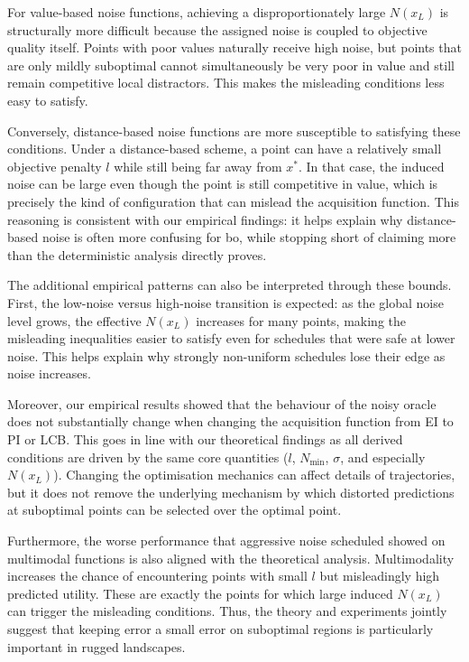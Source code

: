 {For value-based noise functions, achieving a disproportionately large $N(x_L)$ is structurally more difficult because the assigned noise is coupled to objective quality itself. Points with poor values naturally receive high noise, but points that are only mildly suboptimal cannot simultaneously be very poor in value and still remain competitive local distractors. This makes the misleading conditions less easy to satisfy.

Conversely, distance-based noise functions are more susceptible to satisfying these conditions. Under a distance-based scheme, a point can have a relatively small objective penalty $l$ while still being far away from $x^*$. In that case, the induced noise can be large even though the point is still competitive in value, which is precisely the kind of configuration that can mislead the acquisition function. This reasoning is consistent with our empirical findings: it helps explain why distance-based noise is often more confusing for \gls{bo}, while stopping short of claiming more than the deterministic analysis directly proves.

The additional empirical patterns can also be interpreted through these bounds. First, the low-noise versus high-noise transition is expected: as the global noise level grows, the effective $N(x_L)$ increases for many points, making the misleading inequalities easier to satisfy even for schedules that were safe at lower noise. This helps explain why strongly non-uniform schedules lose their edge as noise increases.

Moreover, our empirical results showed that the behaviour of the noisy oracle does not substantially change when changing the acquisition function from EI to PI or LCB. This goes in line with our theoretical findings as all derived conditions are driven by the same core quantities ($l$, $N_{\min}$, $\sigma$, and especially $N(x_L)$). Changing the optimisation mechanics can affect details of trajectories, but it does not remove the underlying mechanism by which distorted predictions at  suboptimal points can be selected over the optimal point.

Furthermore, the worse performance that aggressive noise scheduled showed on multimodal functions is also aligned with the theoretical analysis. Multimodality increases the chance of encountering points with small $l$ but misleadingly high predicted utility. These are exactly the points for which large induced $N(x_L)$ can trigger the misleading conditions. Thus, the theory and experiments jointly suggest that keeping error a small error on suboptimal regions is particularly important in rugged landscapes.}
